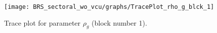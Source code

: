 \begin{figure}[H]
\centering
  \texttt{[image: BRS\_sectoral\_wo\_vcu/graphs/TracePlot\_rho\_g\_blck\_1]}\\
    \caption{Trace plot for parameter ${\rho_g}$ (block number 1).}
\end{figure}
